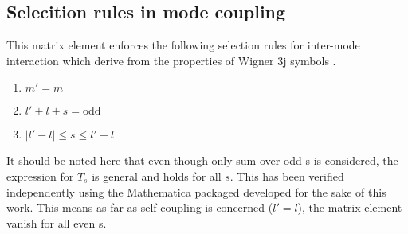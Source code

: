 \subsection{Selecition rules in mode coupling}\label{sec:selec_rules}
This matrix element enforces the following selection rules for inter-mode interaction which derive from the properties of Wigner 3j symbols \cite{lavely92}.
\begin{enumerate}
\item $m'=m$
\item $l'+l+s = \text{odd}$
\item $|l'-l| \leq s \leq l'+l$
\end{enumerate}
It should be noted here that even though only sum over odd s is considered, the expression for $T_s$ is general and holds for all $s$. This has been verified independently using the Mathematica packaged developed for the sake of this work. This means as far as self coupling is concerned ($l'=l$), the matrix element vanish for all even s.